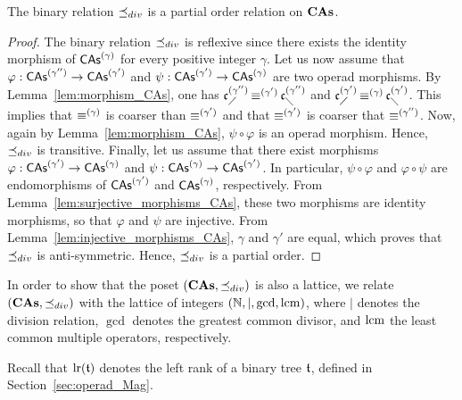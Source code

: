\begin{Proposition}\label{prop:poset_CAs}
    The binary relation $\preceq_{div}$ is a partial order relation on
    $\mathbf{CAs}$.
\end{Proposition}
\begin{proof}
    The binary relation $\preceq_{div}$ is reflexive since there exists the
    identity morphism of $\mathsf{CAs}^{(\gamma)}$ for every positive integer
    $\gamma$. Let us now assume that
    $\varphi:\mathsf{CAs}^{(\gamma'')} \to \mathsf{CAs}^{(\gamma')}$ and
    $\psi:\mathsf{CAs}^{(\gamma')} \to \mathsf{CAs}^{(\gamma)}$ are two operad morphisms. By
    Lemma~\ref{lem:morphism_CAs}, one has
    $\mathfrak{c}^{(\gamma'')}_{\diagup} \operatorname{\equiv}^{(\gamma')} \mathfrak{c}^{(\gamma'')}_{\diagdown}$ and
    $\mathfrak{c}^{(\gamma')}_{\diagup} \operatorname{\equiv}^{(\gamma)} \mathfrak{c}^{(\gamma')}_{\diagdown}$. This implies
    that $\operatorname{\equiv}^{(\gamma)}$ is coarser than $\operatorname{\equiv}^{(\gamma')}$ and
    that $\operatorname{\equiv}^{(\gamma')}$ is coarser that $\operatorname{\equiv}^{(\gamma'')}$. Now,
    again by Lemma~\ref{lem:morphism_CAs}, $\psi \circ \varphi$ is an
    operad morphism. Hence, $\preceq_{div}$ is transitive. Finally, let us
    assume that there exist morphisms
    $\varphi:\mathsf{CAs}^{(\gamma')}\to\mathsf{CAs}^{(\gamma)}$ and
    $\psi:\mathsf{CAs}^{(\gamma)}\to\mathsf{CAs}^{(\gamma')}$. In particular,
    $\psi \circ \varphi$ and $\varphi \circ \psi$ are endomorphisms of
    $\mathsf{CAs}^{(\gamma')}$ and $\mathsf{CAs}^{(\gamma)}$, respectively. From
    Lemma~\ref{lem:surjective_morphisms_CAs}, these two morphisms are
    identity morphisms, so that $\varphi$ and $\psi$ are injective. From
    Lemma~\ref{lem:injective_morphisms_CAs}, $\gamma$ and $\gamma'$ are
    equal, which proves that $\preceq_{div}$ is anti-symmetric. Hence,
    $\preceq_{div}$ is a partial order.
\end{proof}
\medbreak

In order to show that the poset $\left(\mathbf{CAs}, \preceq_{div}\right)$ is also a
lattice, we relate $\left(\mathbf{CAs}, \preceq_{div}\right)$ with the lattice of
integers $\left(\mathbb{N},\mid, \gcd, \operatorname{lcm}\right)$, where $\mid$ denotes the
division relation, $\gcd$ denotes the greatest common divisor, and
$\operatorname{lcm}$ the least common multiple operators, respectively.

Recall that
$\mathrm{lr}(\mathfrak{t})$ denotes the left rank of a binary tree $\mathfrak{t}$, defined in
Section~\ref{sec:operad_Mag}.
\medbreak

